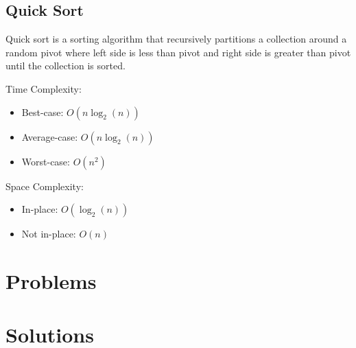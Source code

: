 \subsection{Quick Sort}

Quick sort is a sorting algorithm that recursively partitions a collection around a random pivot where left side is less than pivot and right side is greater than pivot until the collection is sorted.

Time Complexity:

\begin{itemize}
  \item Best-case: $O(n\log_{2}(n))$
  \item Average-case: $O(n\log_{2}(n))$
  \item Worst-case: $O(n^{2})$
\end{itemize}

Space Complexity:

\begin{itemize}
  \item In-place: $O(\log_{2}(n))$
  \item Not in-place: $O(n)$
\end{itemize}

\section{Problems}

\section{Solutions}
